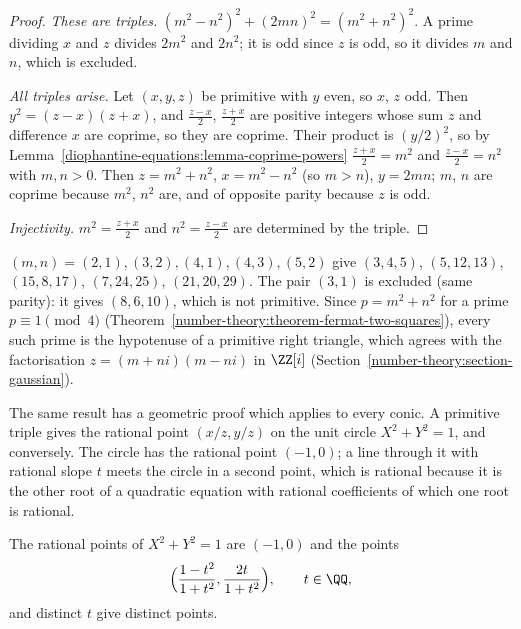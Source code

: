 \begin{proof}
\emph{These are triples.} $(m^2 - n^2)^2 + (2mn)^2 = (m^2 + n^2)^2$. A prime dividing $x$ and $z$ divides $2m^2$ and $2n^2$; it is odd since $z$ is odd, so it divides $m$ and $n$, which is excluded.

\emph{All triples arise.} Let $(x, y, z)$ be primitive with $y$ even, so $x$, $z$ odd. Then $y^2 = (z - x)(z + x)$, and $\frac{z - x}{2}$, $\frac{z + x}{2}$ are positive integers whose sum $z$ and
difference $x$ are coprime, so they are coprime. Their product is $(y/2)^2$, so by Lemma~\ref{diophantine-equations:lemma-coprime-powers} $\frac{z + x}{2} = m^2$ and $\frac{z - x}{2} = n^2$ with $m, n > 0$.
Then $z = m^2 + n^2$, $x = m^2 - n^2$ (so $m > n$), $y = 2mn$; $m$, $n$ are coprime because $m^2$, $n^2$ are, and of opposite parity because $z$ is odd.

\emph{Injectivity.} $m^2 = \frac{z + x}{2}$ and $n^2 = \frac{z - x}{2}$ are determined by the triple.
\end{proof}

\begin{example}\label{diophantine-equations:example-pythagorean}
$(m, n) = (2, 1), (3, 2), (4, 1), (4, 3), (5, 2)$ give $(3, 4, 5)$, $(5, 12, 13)$, $(15, 8, 17)$, $(7, 24, 25)$, $(21, 20, 29)$. The pair $(3, 1)$ is excluded (same parity): it gives $(8, 6, 10)$, which is not
primitive. Since $p = m^2 + n^2$ for a prime $p \equiv 1 \pmod 4$ (Theorem~\ref{number-theory:theorem-fermat-two-squares}), every such prime is the hypotenuse of a primitive right triangle, which agrees with
the factorisation $z = (m + ni)(m - ni)$ in $\ZZ[i]$ (Section~\ref{number-theory:section-gaussian}).
\end{example}

The same result has a geometric proof which applies to every conic. A primitive triple gives the rational point $(x/z, y/z)$ on the unit circle $X^2 + Y^2 = 1$, and conversely. The circle has the rational
point $(-1, 0)$; a line through it with rational slope $t$ meets the circle in a second point, which is rational because it is the other root of a quadratic equation with rational coefficients of which one root
is rational.

\begin{proposition}\label{diophantine-equations:proposition-circle}
The rational points of $X^2 + Y^2 = 1$ are $(-1, 0)$ and the points
\[
\Bigl(\frac{1 - t^2}{1 + t^2}, \frac{2t}{1 + t^2}\Bigr), \qquad t \in \QQ,
\]
and distinct $t$ give distinct points.
\end{proposition}


